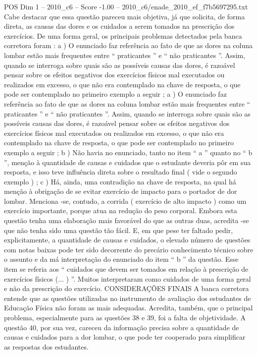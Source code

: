 \begin{textsample}{POS Dim 1 – 2010\_c6 – Score -1.00 – 2010\_c6/enade\_2010\_ef\_f7b5697295.txt}
Cabe destacar que essa questão pareceu mais objetiva, já que solicita, de forma direta, as causas das dores e os cuidados a serem tomados na prescrição dos exercícios.
De uma forma geral, os principais problemas detectados pela banca corretora foram : a ) O enunciado faz referência ao fato de que as dores na coluna lombar estão mais frequentes entre “ praticantes ” e “ não praticantes ”.
Assim, quando se interroga sobre quais são as possíveis causas das dores, é razoável pensar sobre os efeitos negativos dos exercícios físicos mal executados ou realizados em excesso, o que não era contemplado na chave de resposta, o que pode ser contemplado no primeiro exemplo a seguir ; a ) O enunciado faz referência ao fato de que as dores na coluna lombar estão mais frequentes entre “ praticantes ” e “ não praticantes ”.
Assim, quando se interroga sobre quais são as possíveis causas das dores, é razoável pensar sobre os efeitos negativos dos exercícios físicos mal executados ou realizados em excesso, o que não era contemplado na chave de resposta, o que pode ser contemplado no primeiro exemplo a seguir ; b ) Não havia no enunciado, tanto no item “ a ” quanto no “ b ”, menção à quantidade de causas e cuidados que o estudante deveria pôr em sua resposta, e isso teve influência direta sobre o resultado final ( vide o segundo exemplo ) ; c ) Há, ainda, uma contradição na chave de resposta, na qual há menção à obrigação de se evitar exercício de impacto para o portador de dor lombar.
Menciona -se, contudo, a corrida ( exercício de alto impacto ) como um exercício importante, porque atua na redução do peso corporal.
Embora esta questão tenha uma elaboração mais favorável do que as outras duas, acredita -se que não tenha sido uma questão tão fácil.
E, em que pese ter faltado pedir, explicitamente, a quantidade de causas e cuidados, o elevado número de questões com notas baixas pode ter sido decorrente do precário conhecimento técnico sobre o assunto e da má interpretação do enunciado do item “ b ” da questão.
Esse item se referia aos “ cuidados que devem ser tomados em relação à prescrição de exercícios físicos (... ) ”.
Muitos interpretaram como cuidados de uma forma geral e não da prescrição do exercício.
CONSIDERAÇÕES FINAIS A banca corretora entende que as questões utilizadas no instrumento de avaliação dos estudantes de Educação Física não foram as mais adequadas.
Acredita, também, que o principal problema, especialmente para as questões 38 e 39, foi a falta de objetividade.
A questão 40, por sua vez, careceu da informação precisa sobre a quantidade de causas e cuidados para a dor lombar, o que pode ter cooperado para simplificar as respostas dos estudantes.

\end{textsample}
